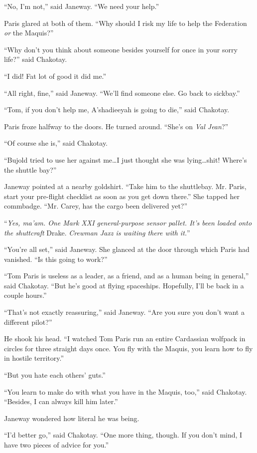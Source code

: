 \documentclass[twoside,letterpaper,12pt]{memoir}
\begin{document}
``No, I'm not,'' said Janeway. ``We need your help.''

Paris glared at both of them. ``Why should I risk my life to help the Federation \textit{or} the Maquis?''

``Why don't you think about someone besides yourself for once in your sorry life?'' said Chakotay.

``I did! Fat lot of good it did me.''

``All right, fine,'' said Janeway. ``We'll find someone else. Go back to sickbay.''

``Tom, if you don't help me, A'shadieeyah is going to die,'' said Chakotay.

Paris froze halfway to the doors. He turned around. ``She's on \textit{Val Jean}?''

``Of course she is,'' said Chakotay.

``Bujold tried to use her against me\ldots I just thought she was lying\ldots shit! Where's the shuttle bay?''

Janeway pointed at a nearby goldshirt. ``Take him to the shuttlebay. Mr. Paris, start your pre-flight checklist as soon as you get down there.'' She tapped her commbadge. ``Mr. Carey, has the cargo been delivered yet?''

``\textit{Yes, ma'am. One Mark XXI general-purpose sensor pallet. It's been loaded onto the shuttcraft} Drake. \textit{Crewman Jaxz is waiting there with it.}''

``You're all set,'' said Janeway. She glanced at the door through which Paris had vanished. ``Is this going to work?''

``Tom Paris is useless as a leader, as a friend, and as a human being in general,'' said Chakotay. ``But he's good at flying spaceships. Hopefully, I'll be back in a couple hours.''

``That's not exactly reassuring,'' said Janeway. ``Are you sure you don't want a different pilot?''

He shook his head. ``I watched Tom Paris run an entire Cardassian wolfpack in circles for three straight days once. You fly with the Maquis, you learn how to fly in hostile territory.''

``But you hate each others' guts.''

``You learn to make do with what you have in the Maquis, too,'' said Chakotay. ``Besides, I can always kill him later.''

Janeway wondered how literal he was being.

``I'd better go,'' said Chakotay. ``One more thing, though. If you don't mind, I have two pieces of advice for you.''
\end{document}
